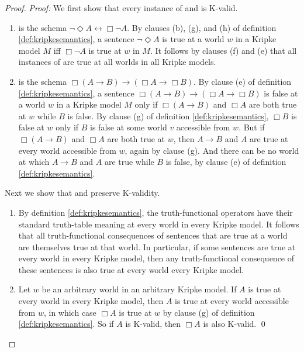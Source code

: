 \begin{proof}
  \emph{Proof:} We first show that every instance of  and  is
  K-valid.
  \begin{enumerate}[leftmargin=7mm]
  \itemsep0mm
  
    \item {} is the schema $\neg\Diamond A \leftrightarrow \Box\neg A$.
          By clauses (b), (g), and (h) of definition \ref{def:kripkesemantics},
          a sentence $\neg\Diamond A$ is true at a world $w$ in a Kripke model
          $M$ iff $\Box\neg A$ is true at $w$ in $M$. It follows by clauses (f)
          and (e) that all instances of  are true at all worlds in all
          Kripke models.
          
    \item {} is the schema $\Box(A \to B) \to (\Box A \to \Box B)$. By
          clause (e) of definition \ref{def:kripkesemantics}, a sentence
          $\Box(A\to B) \to (\Box A \to \Box B)$ is false at a world $w$ in a
          Kripke model $M$ only if $\Box(A \to B)$ and $\Box A$ are both true at
          $w$ while $B$ is false. By clause (g) of definition
          \ref{def:kripkesemantics}, $\Box B$ is false at $w$ only if $B$ is
          false at some world $v$ accessible from $w$. But if $\Box(A \to B)$
          and $\Box A$ are both true at $w$, then $A\to B$ and $A$ are true at
          every world accessible from $w$, again by clause (g). And there can be
          no world at which $A\to B$ and $A$ are true while $B$ is false, by
          clause (e) of definition \ref{def:kripkesemantics}.
  \end{enumerate}
  Next we show that  and  preserve K-validity.
  \begin{enumerate}[leftmargin=9mm]
    
    \item By definition \ref{def:kripkesemantics}, the truth-functional
          operators have their standard truth-table meaning at every world in
          every Kripke model. It follows that all truth-functional consequences
          of sentences that are true at a world are themselves true at that
          world. In particular, if some sentences are true at every world in
          every Kripke model, then any truth-functional consequence of these
          sentences is also true at every world every Kripke model.

    \item Let $w$ be an arbitrary world in an arbitrary Kripke model. If $A$ is
          true at every world in every Kripke model, then $A$ is true at every
          world accessible from $w$, in which case $\Box A$ is true at $w$ by
          clause (g) of definition \ref{def:kripkesemantics}. So if $A$ is K-valid, then $\Box A$ is also K-valid. \qed
          
  \end{enumerate}
\end{proof}

